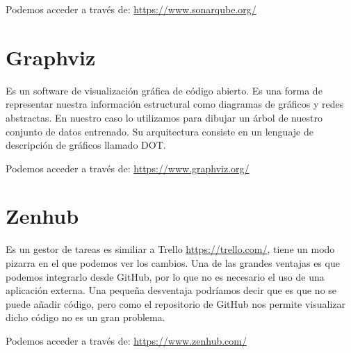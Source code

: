 Podemos acceder a través de: 
\url{https://www.sonarqube.org/}

\section{Graphviz}
Es un software de visualización gráfica de código abierto. Es una forma de representar nuestra información estructural como diagramas de gráficos y redes abstractas. En nuestro caso lo utilizamos para dibujar un  árbol de nuestro conjunto de datos entrenado. Su arquitectura consiste en un lenguaje de descripción de gráficos llamado DOT.

Podemos acceder a través de: 
\url{https://www.graphviz.org/}

\section{Zenhub}
Es un gestor de tareas es similiar a Trello \url{https://trello.com/}, tiene un modo pizarra en el que podemos ver los cambios. Una de las grandes ventajas es que podemos integrarlo desde GitHub, por lo que no es necesario el uso de una aplicación externa. Una pequeña desventaja podríamos decir que es que no se puede añadir código, pero como el repositorio de GitHub nos permite visualizar dicho código no es un gran problema.

Podemos acceder a través de: 
\url{https://www.zenhub.com/}